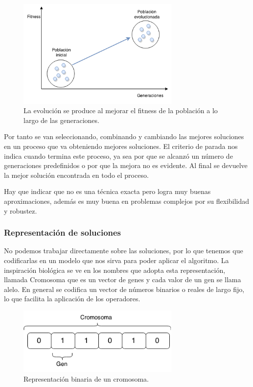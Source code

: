 \begin{figure}[H]
	\centering
	\includegraphics[width=8cm]{Figures/fitness_generaciones}
	\caption{La evolución se produce al mejorar el fitness de la población a lo largo de las generaciones.}
	\label{fig:fitness_generaciones}
\end{figure}



Por tanto se van seleccionando, combinando y cambiando las mejores soluciones en un proceso que va obteniendo mejores soluciones.
El criterio de parada nos indica cuando termina este proceso, ya sea por que se alcanzó un número de generaciones predefinidos o por que la mejora no es evidente. Al final se devuelve la mejor solución encontrada en todo el proceso.

Hay que indicar que no es una técnica exacta pero logra muy buenas aproximaciones, además es muy buena en problemas complejos por su flexibilidad y robustez. 


\subsubsection{Representación de soluciones}
No podemos trabajar directamente sobre las soluciones, por lo que tenemos que codificarlas en un modelo que nos sirva para poder aplicar el algoritmo.
La inspiración biológica se ve en los nombres que adopta esta representación, llamada Cromosoma que es un vector de genes y cada valor de un gen se llama alelo.
En general se codifica un vector de números binarios o reales de largo fijo, lo que facilita la aplicación de los operadores.

\begin{figure}[H]
	\centering
	\includegraphics[width=8cm]{Figures/rep_binaria}
	\caption{Representación binaria de un cromosoma.}
	\label{fig:rep_binaria}
\end{figure}


